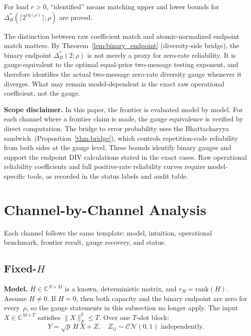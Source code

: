 \documentclass[lettersize,onecolumn]{IEEEtran}
\newcommand{\C}{\mathbb{C}}
\newcommand{\snr}{\rho}
\begin{document}
For load $r>0$, ``identified'' means matching upper and lower bounds
for $\Delta_B^*(\lceil 2^{r g(\snr)}\rceil;\snr)$ are proved.

The distinction between raw coefficient match and atomic-normalized
endpoint match matters. By Theorem~\ref{lem:binary_endpoint}
(diversity-side bridge), the binary endpoint
$\Delta_B^*(2;\snr)$ is not merely a proxy for zero-rate
reliability. It is gauge-equivalent to the optimal equal-prior
two-message testing exponent, and therefore identifies the actual
two-message zero-rate diversity gauge whenever it diverges. What may
remain model-dependent is the exact raw operational coefficient, not
the gauge.

\textbf{Scope disclaimer.}
In this paper, the frontier is evaluated model by model. For each
channel where a frontier claim is made, the gauge
equivalence is verified by direct computation. The bridge to error
probability uses the Bhattacharyya
sandwich~(Proposition~\ref{thm:bridge}), which controls
repetition-code reliability from both sides at the gauge level.
These bounds identify binary gauges and support the endpoint DIV
calculations stated in the exact cases. Raw operational reliability
coefficients and full positive-rate reliability curves require
model-specific tools, as recorded in the status labels and audit
table.

\section{Channel-by-Channel Analysis}\label{sec:channels}

Each channel follows the same template: model, intuition, operational
benchmark, frontier result, gauge recovery, and status.

\subsection{Fixed-$H$}\label{subsec:ch_det}

\textbf{Model.}
$H \in \C^{N\times M}$ is a known, deterministic matrix, and
$r_H = \mathrm{rank}(H)$. Assume $H \ne 0$. If $H = 0$, then both capacity and the binary endpoint are zero for
every~$\snr$, so the gauge statements in this subsection no longer
apply.
The input $X \in \C^{M\times T}$
satisfies $\|X\|_F^2 \le T$. Over one $T$-slot block:
\begin{equation}\label{eq:model_det}
Y = \sqrt{\snr}\,H\,X + Z, \quad Z_{ij} \sim \mathcal{CN}(0,1)
\text{ independently.}
\end{equation}
\end{document}
